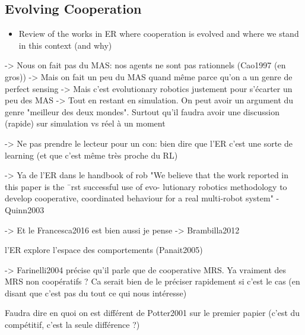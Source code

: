   \subsection{Evolving Cooperation}
    \begin{itemize}
      \item{Review of the works in ER where cooperation is evolved and where we stand in this context (and why)}
    \end{itemize}

    -> Nous on fait pas du MAS: nos agents ne sont pas rationnels (Cao1997 (en gros))
          -> Mais on fait un peu du MAS quand même parce qu'on a un genre de perfect sensing
          -> Mais c'est evolutionary robotics justement pour s'écarter un peu des MAS
          -> Tout en restant en simulation. On peut avoir un argument du genre "meilleur des deux mondes". Surtout qu'il faudra avoir une discussion (rapide) sur simulation vs réel à un moment

    -> Ne pas prendre le lecteur pour un con: bien dire que l'ER c'est une sorte de learning (et que c'est même très proche du RL)

    -> Ya de l'ER dans le handbook of rob
    "We believe that the work reported in this paper is the ¯rst successful use of evo- lutionary robotics methodology to develop cooperative, coordinated behaviour for a real multi-robot system" - Quinn2003

    -> Et le Francesca2016 est bien aussi je pense
    -> Brambilla2012

    l'ER explore l'espace des comportements (Panait2005)



    -> Farinelli2004 précise qu'il parle que de cooperative MRS. Ya vraiment des MRS non coopératifs ? Ca serait bien de le préciser rapidement si c'est le cas (en disant que c'est pas du tout ce qui nous intéresse)

    Faudra dire en quoi on est différent de Potter2001 sur le premier papier (c'est du compétitif, c'est la seule différence ?)









































